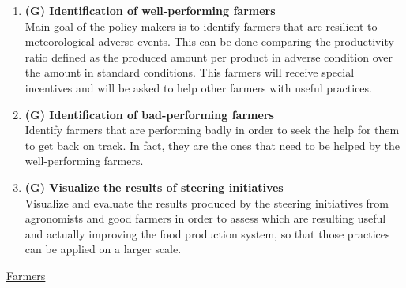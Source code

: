 \documentclass[table, 12pt]{article}
\begin{document}
\begin{enumerate}
    \item \textbf{(G) Identification of well-performing farmers}\\
    Main goal of the policy makers is to identify farmers that are resilient to meteorological adverse events.
    This can be done comparing the productivity ratio defined as the produced amount per product in adverse condition over the amount in standard conditions.
    This farmers will receive special incentives and will be asked to help other farmers 
    with useful practices.
    \item \textbf{(G) Identification of bad-performing farmers}\\
    Identify farmers that are performing badly in order to seek the help for them to get back on track. In fact, they are the ones that need to be helped by the well-performing farmers.
    \item \textbf{(G) Visualize the results of steering initiatives}\\
    Visualize and evaluate the results produced by the steering initiatives from agronomists and good farmers in order to assess which are resulting useful and actually improving the food production system, so that those practices can be applied on a larger scale.
\end{enumerate}
\underline{Farmers}
\end{document}
